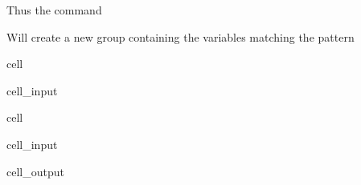 \documentclass[letterpaper,10pt,english]{jupyterBook}
\begin{document}
\sphinxAtStartPar
Thus the command

\sphinxAtStartPar
{}

\sphinxAtStartPar
Will create a new group containing the variables matching the pattern

\begin{sphinxuseclass}{cell}\begin{sphinxVerbatimInput}

\begin{sphinxuseclass}{cell_input}
\begin{sphinxVerbatim}[commandchars=\\\{\}]
\PYG{p}{[}\PYG{p}{]}
                
\end{sphinxVerbatim}

\end{sphinxuseclass}\end{sphinxVerbatimInput}

\end{sphinxuseclass}
\begin{sphinxuseclass}{cell}\begin{sphinxVerbatimInput}

\begin{sphinxuseclass}{cell_input}
\begin{sphinxVerbatim}[commandchars=\\\{\}]
\PYG{p}{[}\PYG{p}{]}
\end{sphinxVerbatim}

\end{sphinxuseclass}\end{sphinxVerbatimInput}
\begin{sphinxVerbatimOutput}

\begin{sphinxuseclass}{cell_output}
\begin{sphinxVerbatim}
\end{sphinxVerbatim}

\end{sphinxuseclass}\end{sphinxVerbatimOutput}

\end{sphinxuseclass}
\end{document}
